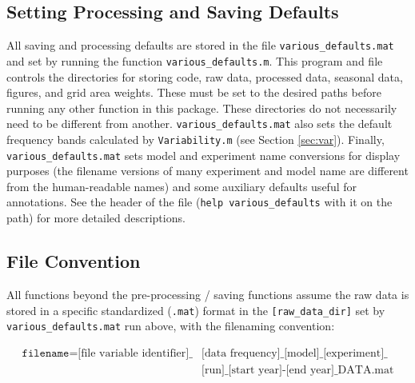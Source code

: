 \documentclass{article}
\begin{document}
\subsection{Setting Processing and Saving Defaults}
All saving and processing defaults are stored in the file \texttt{various\_defaults.mat} and set by running the function \texttt{various\_defaults.m}. This program and file controls the directories for storing code, raw data, processed data, seasonal data, figures, and grid area weights. These must be set to the desired paths before running any other function in this package. These directories do not necessarily need to be different from another. \texttt{various\_defaults.mat} also sets the default frequency bands calculated by \texttt{Variability.m} (see Section \ref{sec:var}). Finally, \texttt{various\_defaults.mat} sets model and experiment name conversions for display purposes (the filename versions of many experiment and model name are different from the human-readable names) and some auxiliary defaults useful for annotations. See the header of the file (\texttt{help various\_defaults} with it on the path) for more detailed descriptions.

\subsection{File Convention}
All functions beyond the pre-processing / saving functions assume the raw data is stored in a specific standardized (\texttt{.mat}) format in the \texttt{[raw\_data\_dir]} set by \texttt{various\_defaults.mat} run above, with the filenaming convention: 

\begin{equation}
\begin{split}
\texttt{filename} = \text{[file variable identifier]\_}&\text{[data frequency]\_[model]\_[experiment]\_}\\
&\text{[run]\_[start year]-[end year]\_DATA.mat}
\end{split}
\end{equation}
\end{document}
